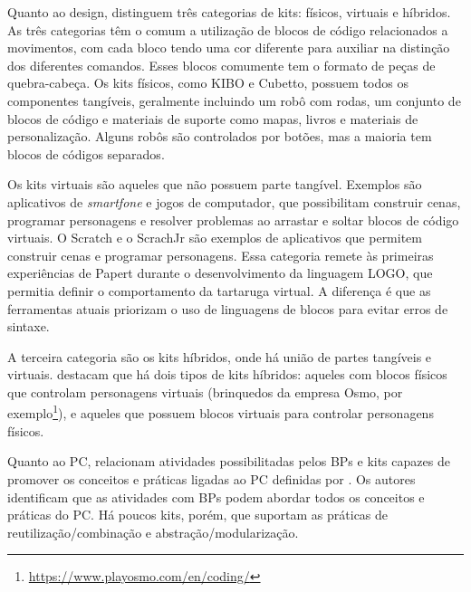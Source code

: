 Quanto ao design,  distinguem três categorias de kits: físicos, virtuais e híbridos. As três categorias têm o comum a utilização de blocos de código relacionados a movimentos, com cada bloco tendo uma cor diferente para auxiliar na distinção dos diferentes
comandos. Esses blocos comumente tem o formato de peças de quebra-cabeça. Os kits físicos, como KIBO e Cubetto, possuem todos os componentes tangíveis, geralmente incluindo um robô com rodas, um conjunto de blocos de código e materiais de suporte como mapas, livros e materiais de personalização. Alguns robôs são controlados por botões, mas a maioria tem blocos de códigos separados.

Os kits virtuais são aqueles que não possuem parte tangível. Exemplos são aplicativos de \textit{smartfone} e jogos de computador, que possibilitam construir cenas, programar personagens e resolver problemas ao arrastar e soltar blocos de código virtuais. O Scratch e o ScrachJr são exemplos de aplicativos que permitem construir cenas e programar personagens. Essa categoria remete às primeiras experiências de Papert durante o desenvolvimento da linguagem LOGO, que permitia definir o comportamento da tartaruga virtual. A diferença é que as ferramentas atuais priorizam o uso de linguagens de blocos para evitar erros de sintaxe.

A terceira categoria são os kits híbridos, onde há união de partes tangíveis e virtuais.  destacam que há dois tipos de kits híbridos: aqueles com blocos físicos que controlam personagens virtuais (brinquedos da empresa Osmo, por exemplo\footnote{\url{https://www.playosmo.com/en/coding/}}), e aqueles que possuem blocos virtuais para controlar personagens físicos.

Quanto ao \acl{PC},  relacionam atividades possibilitadas pelos BPs e kits capazes de promover os conceitos e práticas ligadas ao \ac{PC} definidas por . Os autores identificam que as atividades com BPs podem abordar todos os conceitos e práticas do \ac{PC}. Há poucos kits, porém, que suportam as práticas de reutilização/combinação e abstração/modularização.

